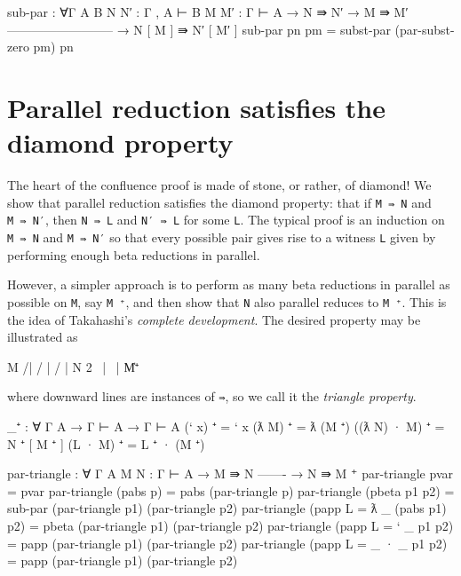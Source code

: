 \begin{fence}
\begin{code}
sub-par : ∀{Γ A B} {N N′ : Γ , A ⊢ B} {M M′ : Γ ⊢ A}
  → N ⇛ N′
  → M ⇛ M′
    --------------------------
  → N [ M ] ⇛ N′ [ M′ ]
sub-par pn pm = subst-par (par-subst-zero pm) pn
\end{code}
\end{fence}

\hypertarget{parallel-reduction-satisfies-the-diamond-property}{%
\section{Parallel reduction satisfies the diamond
property}\label{parallel-reduction-satisfies-the-diamond-property}}

The heart of the confluence proof is made of stone, or rather, of
diamond! We show that parallel reduction satisfies the diamond property:
that if \texttt{M\ ⇛\ N} and \texttt{M\ ⇛\ N′}, then \texttt{N\ ⇛\ L}
and \texttt{N′\ ⇛\ L} for some \texttt{L}. The typical proof is an
induction on \texttt{M\ ⇛\ N} and \texttt{M\ ⇛\ N′} so that every
possible pair gives rise to a witness \texttt{L} given by performing
enough beta reductions in parallel.

However, a simpler approach is to perform as many beta reductions in
parallel as possible on \texttt{M}, say \texttt{M\ ⁺}, and then show
that \texttt{N} also parallel reduces to \texttt{M\ ⁺}. This is the idea
of Takahashi's \emph{complete development}. The desired property may be
illustrated as

\begin{myDisplay}
    M
   /|
  / |
 /  |
N   2
 \  |
  \ |
   \|
    M⁺
\end{myDisplay}

where downward lines are instances of \texttt{⇛}, so we call it the
\emph{triangle property}.

\begin{fence}
\begin{code}
_⁺ : ∀ {Γ A}
  → Γ ⊢ A → Γ ⊢ A
(` x) ⁺       =  ` x
(ƛ M) ⁺       = ƛ (M ⁺)
((ƛ N) · M) ⁺ = N ⁺ [ M ⁺ ]
(L · M) ⁺     = L ⁺ · (M ⁺)

par-triangle : ∀ {Γ A} {M N : Γ ⊢ A}
  → M ⇛ N
    -------
  → N ⇛ M ⁺
par-triangle pvar          = pvar
par-triangle (pabs p)      = pabs (par-triangle p)
par-triangle (pbeta p1 p2) = sub-par (par-triangle p1) (par-triangle p2)
par-triangle (papp {L = ƛ _ } (pabs p1) p2) =
  pbeta (par-triangle p1) (par-triangle p2)
par-triangle (papp {L = ` _}   p1 p2) = papp (par-triangle p1) (par-triangle p2)
par-triangle (papp {L = _ · _} p1 p2) = papp (par-triangle p1) (par-triangle p2)
\end{code}
\end{fence}


